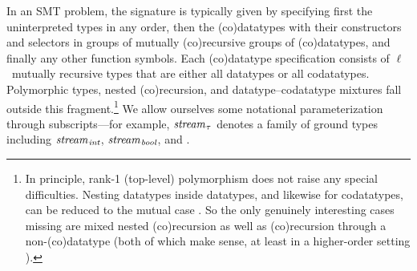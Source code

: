 \documentclass[smallcondensed,draft]{svjour3}
\newcommand\ty[1]{\textit{#1}}
\newcommand\vthinspace{\kern+0.083333em}
\begin{document}
In an SMT problem, the signature is typically given by specifying first the
uninterpreted %
types in any order, then the (co)datatypes with their constructors
and selectors in groups of mutually (co)recursive groups of (co)datatypes, and
finally any other function symbols.
%
Each (co)datatype specification consists of $\ell$~mutually recursive types that are
either all datatypes or all codatatypes. Polymorphic types, nested
(co)recursion, and datatype--codatatype mixtures
fall outside this fragment.\footnote{In principle, rank-1 (top-level) polymorphism \cite{blanchette-paskevich-2013}
does not raise any special difficulties. Nesting datatypes inside datatypes,
and likewise for codatatypes, can be reduced to the mutual case
\cite{gunter-1993-not}. So the only genuinely interesting cases missing are
mixed nested (co)recursion as well as
(co)recursion through a non-(co)datatype (both of which make sense,
at least in a higher-order setting \cite{blanchette-et-al-2014-impl}).}
We allow ourselves some notational parameterization
through subscripts---for example, $\ty{stream}_{\vthinspace\tau}$ denotes a
family of ground types including
$\ty{stream}_{\vthinspace\ty{int}}$, $\ty{stream}_{\vthinspace\ty{bool}}$,
and \smash{$\ty{stream}_{\vthinspace\ty{stream}_{\vthinspace\ty{real}}}$}.

\newcommand\elll{\kern.0515ex \ell\kern.0515ex}
\newcommand\elllx{\kern.0515ex \ell\kern.0515ex}
\end{document}
